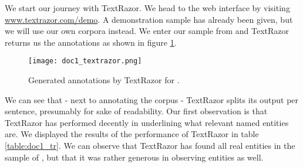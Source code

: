 \documentclass[a4paper, 11pt]{article}
\begin{document}
We start our journey with TextRazor. We head to the web interface by visiting \url{www.textrazor.com/demo}. A demonstration sample has already been given, but we will use our own corpora instead. We enter our sample from \citet{mcgee_2020} and TextRazor returns us the annotations as shown in figure \ref{fig:doc1tr}.

\begin{figure}[h]
	\label{fig:doc1tr}
	\texttt{[image: doc1\_textrazor.png]}
	\caption{Generated annotations by TextRazor for \citet{mcgee_2020}.}
\end{figure}

We can see that - next to annotating the corpus - TextRazor splits its output per sentence, presumably for sake of readability. Our first observation is that TextRazor has performed  decently in underlining what relevant named entities are. We displayed the results of the performance of TextRazor in table \ref{table:doc1_tr}. We can observe that TextRazor has found all real entities in the sample of \citet{mcgee_2020}, but that it was rather generous in observing entities as well.

\begin{table}[h]
	\centering
\caption{Performance report of TextRazor analyzing the \citet{mcgee_2020} sample.}
\label{table:doc1_tr}
\end{table}
\end{document}
